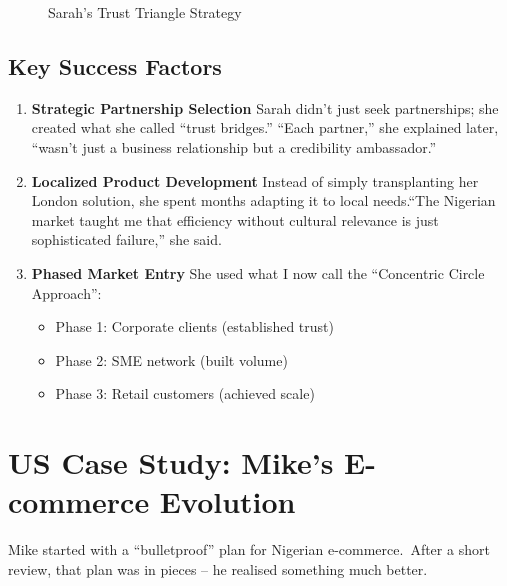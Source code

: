 \begin{figure}[h]
    \centering
    \caption{Sarah's Trust Triangle Strategy}\label{fig:trust-triangle}
\end{figure}

\subsection{Key Success Factors}\label{subsec:key-success-factors}
\begin{enumerate}
    \item \textbf{Strategic Partnership Selection}
    Sarah didn't just seek partnerships; she created what she called ``trust bridges.'' ``Each partner,'' she explained later, ``wasn't just a business relationship but a credibility ambassador.''

    \item \textbf{Localized Product Development}
    Instead of simply transplanting her London solution, she spent months adapting it to local needs.``The Nigerian market taught me that efficiency without cultural relevance is just sophisticated failure,'' she said.

    \item \textbf{Phased Market Entry}
    She used what I now call the ``Concentric Circle Approach'':
    \begin{itemize}
        \item Phase 1: Corporate clients (established trust)
        \item Phase 2: SME network (built volume)
        \item Phase 3: Retail customers (achieved scale)
    \end{itemize}
\end{enumerate}

\section{US Case Study: Mike's E-commerce Evolution}\label{sec:us-case-study:-mike's-e-commerce-evolution}

Mike started with a ``bulletproof'' plan for Nigerian e-commerce.\ After a short review, that plan was in pieces – he realised something much better.
